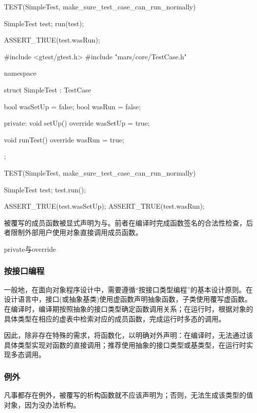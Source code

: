 \begin{content}
\begin{lastdiff}
\begin{c++}
TEST(SimpleTest, make_sure_test_case_can_run_normally) {
  SimpleTest test;
  run(test);

  ASSERT_TRUE(test.wasRun);
}
 \end{c++}
\tcblower
 \begin{c++}
#include <gtest/gtest.h>
#include "mars/core/TestCase.h"

namespace {
  struct SimpleTest : TestCase {
    bool wasSetUp = false;
    bool wasRun = false;

  private:
    void setUp() override {
      wasSetUp = true;
    }

    void runTest() override {
      wasRun = true;
    }
  };
}

TEST(SimpleTest, make_sure_test_case_can_run_normally) {
  SimpleTest test;
  test.run();

  ASSERT_TRUE(test.wasSetUp);
  ASSERT_TRUE(test.wasRun);
}
 \end{c++} 
\end{lastdiff}

被覆写的成员函数被显式声明为与。前者在编译时完成函数签名的合法性检查，后者限制外部用户使用对象直接调用成员函数。

\begin{episode}{private与override}
\begin{content}

\subsubsection{按接口编程}

一般地，在面向对象程序设计中，需要遵循“按接口类型编程”的基本设计原则。在设计语言中，接口(或抽象基类)使用虚函数声明抽象函数，子类使用覆写虚函数。在编译时，编译期按照抽象的接口类型确定函数调用关系；在运行时，根据对象的具体类型在相应的虚表中检索对应的成员函数，完成运行时多态的调用。

因此，除非存在特殊的需求，将函数化，以明确对外声明：在编译时，无法通过该具体类型实现对函数的直接调用；推荐使用抽象的接口类型或基类型，在运行时实现多态调用。

\subsubsection{例外}

凡事都存在例外，被覆写的析构函数就不应该声明为；否则，无法生成该类型的值对象，因为没办法析构。


\end{content}
\end{episode}
\end{content}

